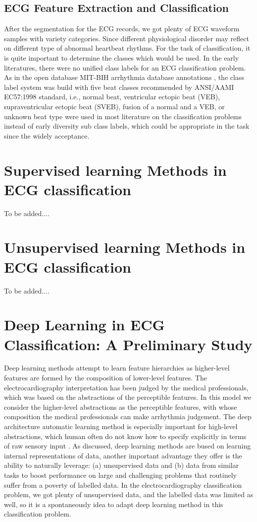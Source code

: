 \documentclass{bmcart}
\begin{document}
\subsection*{ECG Feature Extraction and Classification}
After the segmentation for the ECG records, we got plenty of ECG waveform samples with variety categories. Since different physiological disorder may reflect on different type of abnormal heartbeat rhythms. For the task of classification, it is quite important to determine the classes which would be used. In the early literatures, there were no unified class labels for an ECG classification problem. As in the open database MIT-BIH arrhythmia database annotations \cite{mark1982annotated, moody1990bih}, the class label system was build with five beat classes recommended by ANSI/AAMI EC57:1998 standard, i.e., normal beat, ventricular ectopic beat (VEB), supraventricular ectopic beat (SVEB), fusion of a normal and a VEB, or unknown beat type were used in most literature on the classification problems instead of early diversity sub class labels, which could be appropriate in the task since the widely acceptance. 


\section*{Supervised learning Methods in ECG classification}

To be added....

\section*{Unsupervised learning Methods in ECG classification}

To be added....


\section*{Deep Learning in ECG Classification: A Preliminary Study}
Deep learning methods attempt to learn feature hierarchies as higher-level features are formed by the composition of lower-level features. The electrocardiography interpretation has been judged by the medical professionals, which was based on the abstractions of the perceptible features. In this model we consider the higher-level abstractions as the perceptible features, with whose composition the medical professionals can make arrhythmia judgement. The deep architecture automatic learning method is especially important for high-level abstractions, which human often do not know how to specify explicitly in terms of raw sensory input \cite{erhan}. As \cite{collobert} discussed, deep learning methods are bused on learning internal representations of data, another important advantage they offer is the ability to naturally leverage: (a) unsupervised data and (b) data from similar tasks to boost performance on large and challenging problems that routinely suffer from a poverty of labelled data. In the electrocardiography classification problem, we got plenty of unsupervised data, and the labelled data was limited as well, so it is a spontaneously idea to adapt deep learning method in this classification problem. 
\end{document}
